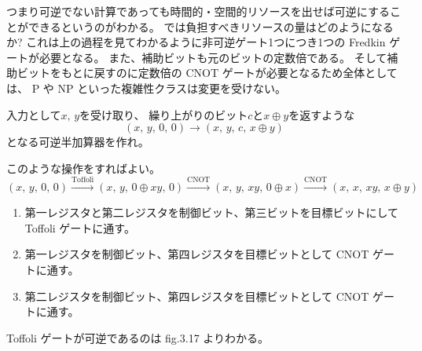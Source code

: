 \documentclass[../../master.tex]{subfiles}
\begin{document}
つまり可逆でない計算であっても時間的・空間的リソースを出せば可逆にすることができるというのがわかる。
では負担すべきリソースの量はどのようになるか?
これは上の過程を見てわかるように非可逆ゲート1つにつき1つの Fredkin ゲートが必要となる。
また、補助ビットも元のビットの定数倍である。
そして補助ビットをもとに戻すのに定数倍の CNOT ゲートが必要となるため全体としては、
P や NP といった複雑性クラスは変更を受けない。
\\
\begin{tcolorbox}[title= 可逆半加算器]
    入力として\(x,\,y\)を受け取り、
    繰り上がりのビット\(c\)と\(x\oplus y\)を返すような
    \begin{equation*}
        (x,\,y,\,0,\,0) \rightarrow (x,\,y,\,c,\,x\oplus y)
    \end{equation*}
    となる可逆半加算器を作れ。
\end{tcolorbox}
このような操作をすればよい。
\begin{equation*}
    (x,\,y,\,0,\,0)
    \overset{\text{Toffoli}}{\longrightarrow} (x,\,y,\,0\oplus xy,\,0)
    \overset{\text{CNOT}}{\longrightarrow} (x,\,y,\,xy,\,0\oplus x)
    \overset{\text{CNOT}}{\longrightarrow} (x,\,x,\,xy,\,x\oplus y)
\end{equation*}
\begin{enumerate}
    \item 第一レジスタと第二レジスタを制御ビット、第三ビットを目標ビットにして Toffoli ゲートに通す。
    \item 第一レジスタを制御ビット、第四レジスタを目標ビットとして CNOT ゲートに通す。
    \item 第二レジスタを制御ビット、第四レジスタを目標ビットとして CNOT ゲートに通す。
\end{enumerate}
Toffoli ゲートが可逆であるのは fig.3.17 よりわかる。
\end{document}
